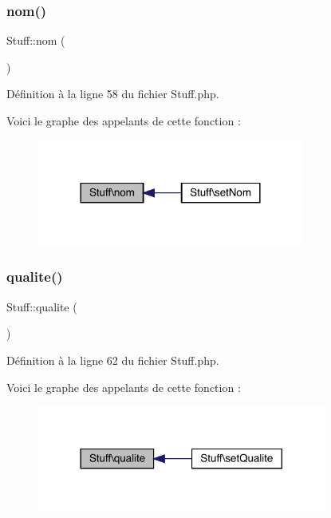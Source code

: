 \subsubsection{\texorpdfstring{nom()}{nom()}}
{\footnotesize\ttfamily Stuff\+::nom (\begin{DoxyParamCaption}{ }\end{DoxyParamCaption})}



Définition à la ligne 58 du fichier Stuff.\+php.

Voici le graphe des appelants de cette fonction \+:\nopagebreak
\begin{figure}[H]
\begin{center}
\leavevmode
\includegraphics[width=248pt]{class_stuff_a38d4592ddc6ed1f09868ea5b7a82fdb9_icgraph}
\end{center}
\end{figure}
\mbox{\label{class_stuff_a30e7d02611dc95bd7481781e503f575d}} 
\subsubsection{\texorpdfstring{qualite()}{qualite()}}
{\footnotesize\ttfamily Stuff\+::qualite (\begin{DoxyParamCaption}{ }\end{DoxyParamCaption})}



Définition à la ligne 62 du fichier Stuff.\+php.

Voici le graphe des appelants de cette fonction \+:\nopagebreak
\begin{figure}[H]
\begin{center}
\leavevmode
\includegraphics[width=269pt]{class_stuff_a30e7d02611dc95bd7481781e503f575d_icgraph}
\end{center}
\end{figure}
\mbox{\label{class_stuff_a87e45b3acdcbf5190778daefa47d877e}} 
